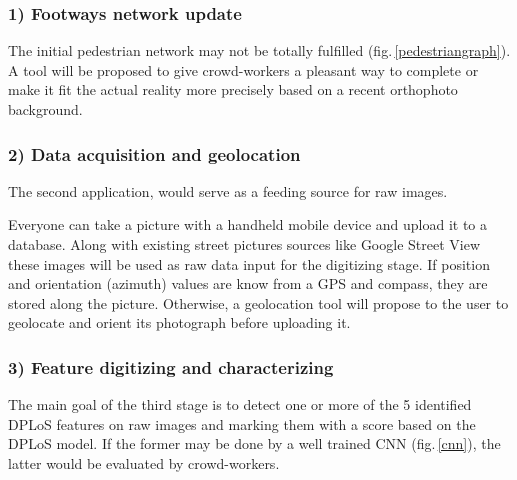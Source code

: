\documentclass[10pt,conference,a4paper]{IEEEtran}
\begin{document}
\subsubsection*{1) Footways network update}
The initial pedestrian network  may not be totally fulfilled (fig.\,\ref{pedestriangraph}). A tool will be proposed to give crowd-workers a pleasant way to complete or make it fit the actual reality more precisely based on a recent orthophoto background. %


\subsubsection*{2) Data acquisition and geolocation}
The second application, %
would serve as a feeding source for raw images. 

Everyone can take a picture with a handheld mobile device and upload it to a database. Along with existing street pictures sources like Google Street View %
these images will be used as raw data input for the digitizing stage.
If position and orientation (azimuth) values are know from a GPS and compass, they are stored along the picture. Otherwise, a geolocation tool will propose to the user to geolocate and orient its photograph before uploading it. %



\subsubsection*{3) Feature digitizing and characterizing}
The main goal of the third stage %
is to detect one or more of the 5 identified DPLoS features on raw images and marking them with a score based on the DPLoS model. If the former may be done by a well trained CNN (fig.\,\ref{cnn}), the latter would be evaluated by crowd-workers.
\end{document}
